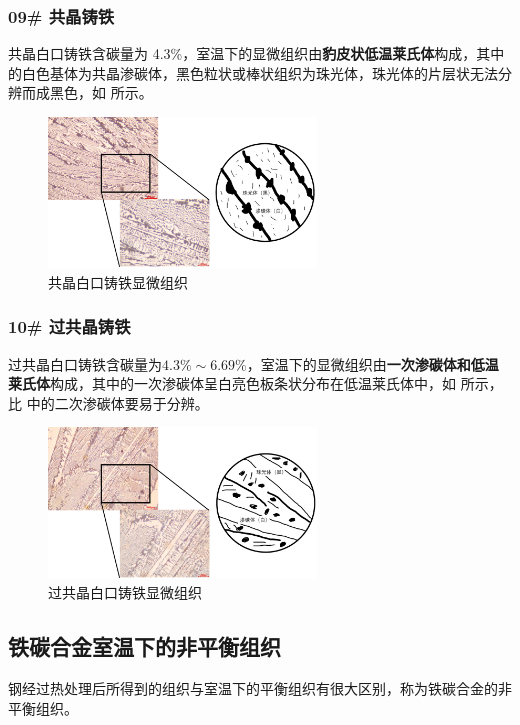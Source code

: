 \documentclass[a4paper,utf8]{article}
\begin{document}
        \subsubsection{09# 共晶铸铁}
            共晶白口铸铁含碳量为 4.3\%，室温下的显微组织由\textbf{豹皮状低温莱氏体}构成，其中的白色基体为共晶渗碳体，黑色粒状或棒状组织为珠光体，珠光体的片层状无法分辨而成黑色，如 所示。
            \begin{figure}[!ht]
                \includegraphics[height=40mm]{result/6.pdf}
                \caption{共晶白口铸铁显微组织\label{fig:6}}
            \end{figure}

        \subsubsection{10# 过共晶铸铁}
            过共晶白口铸铁含碳量为$4.3\%\sim 6.69\%$，室温下的显微组织由\textbf{一次渗碳体和低温莱氏体}构成，其中的一次渗碳体呈白亮色板条状分布在低温莱氏体中，如 所示，比 中的二次渗碳体要易于分辨。
            \begin{figure}[!ht]
                \includegraphics[height=40mm]{result/7.pdf}
                \caption{过共晶白口铸铁显微组织\label{fig:7}}
            \end{figure}
            \newpage
    \subsection{铁碳合金室温下的非平衡组织}
        钢经过热处理后所得到的组织与室温下的平衡组织有很大区别，称为铁碳合金的非平衡组织。\par
\end{document}
